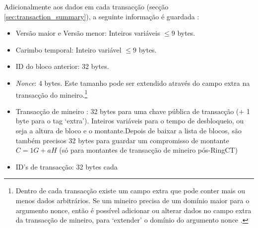 
Adicionalmente aos dados em cada transacção (secção \ref{sec:transaction_summary}), a seguinte informação é guardada :

\begin{itemize}
\setlength\itemsep{\listspace}
    \item Versão maior e Versão menor: Inteiros variáveis $\leq 9$ bytes.
    \item Carimbo temporal: Inteiro variável $\leq 9$ bytes.
    \item ID do bloco anterior: 32 bytes.
    \item {\em Nonce}: 4 bytes. Este tamanho pode ser extendido através do campo extra na transacção do mineiro.\footnote{Dentro de cada transacção existe um campo extra que pode conter mais ou menos dados arbitrários. Se um mineiro precisa de um domínio maior para o argumento nonce, então é possível adicionar ou alterar dados no campo extra da transacção de mineiro, para `extender' o domínio do argumento nonce \cite{extra-field-stackexchange}.} 
    \item Transacção de mineiro : 32 bytes para uma chave pública de transacção (+ 1 byte para o tag `extra'). Inteiros variáveis para o tempo de desbloqueio, ou seja a altura de bloco e o montante.\newline Depois de baixar a lista de blocos, são também precisos 32 bytes para guardar um compromisso de montante $C = 1G + a H$ (só para montantes de transacção de mineiro pós-RingCT)
    \item ID's de transacção: 32 bytes cada
\end{itemize}
